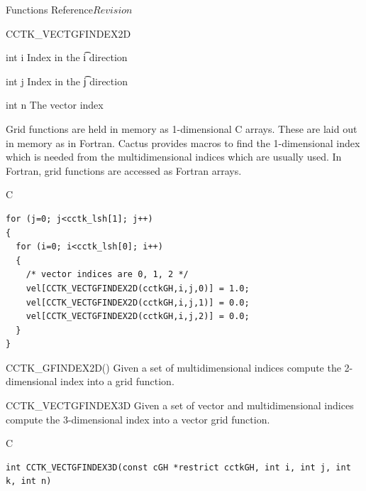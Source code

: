 \begin{cactuspart}{ Functions Reference}{}{$Revision$}
\begin{FunctionDescription}{CCTK\_VECTGFINDEX2D}
\begin{ParameterSection}
\begin{Parameter} {int i}
Index in the \t{i} direction
\end{Parameter}

\begin{Parameter} {int j}
Index in the \t{j} direction
\end{Parameter}

\begin{Parameter} {int n}
The vector index
\end{Parameter}
\end{ParameterSection}

\begin{Discussion}
Grid functions are held in memory as 1-dimensional C arrays. These are
laid out in memory as in Fortran. Cactus provides macros to find the
1-dimensional index which is needed from the multidimensional indices which
are usually used. In Fortran, grid functions are accessed as Fortran arrays.
\end{Discussion}
\begin{ExampleSection}
\begin{Example}{C}
\begin{verbatim}
for (j=0; j<cctk_lsh[1]; j++)
{
  for (i=0; i<cctk_lsh[0]; i++)
  {
    /* vector indices are 0, 1, 2 */
    vel[CCTK_VECTGFINDEX2D(cctkGH,i,j,0)] = 1.0;
    vel[CCTK_VECTGFINDEX2D(cctkGH,i,j,1)] = 0.0;
    vel[CCTK_VECTGFINDEX2D(cctkGH,i,j,2)] = 0.0;
  }
}
\end{verbatim}
\end{Example}
\end{ExampleSection}
\begin{SeeAlsoSection}
\begin{SeeAlso}{CCTK\_GFINDEX2D()}
Given a set of multidimensional indices compute the 2-dimensional index into a
grid function.
\end{SeeAlso}

\end{SeeAlsoSection}
\end{FunctionDescription}



\begin{FunctionDescription}{CCTK\_VECTGFINDEX3D}
\label{CCTK-VECTGFINDEX3D}
Given a set of vector and multidimensional indices compute the 3-dimensional
index into a vector grid function.
\begin{SynopsisSection}
\begin{Synopsis}{C}
\begin{verbatim}
int CCTK_VECTGFINDEX3D(const cGH *restrict cctkGH, int i, int j, int k, int n)
\end{verbatim}
\end{Synopsis}
\end{SynopsisSection}


\end{FunctionDescription}
\end{cactuspart}
